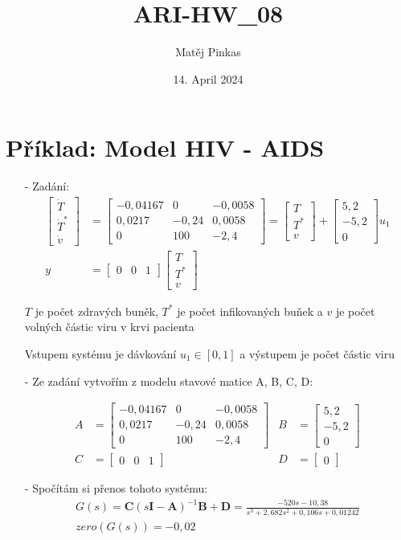 \documentclass{article}
\title{ARI-HW\_08}
\author{Matěj Pinkas}
\date{14. April 2024}
\newcommand\mat[1]{\begin{bmatrix}#1\end{bmatrix}}
\begin{document}
\maketitlessz

\section{Příklad: Model HIV - AIDS}
\begin{itemize}
    \item[-] Zadání: 
    \begin{align*}
        \mat{\dot{T}\\\dot{T}^*\\\dot{v}} &= \mat{-0,04167 & 0 & -0,0058\\0,0217 & -0,24 & 0,0058\\0 & 100 & -2,4} = \mat{T\\T^*\\v} + \mat{5,2\\-5,2\\0}u_1\\
        y &= \mat{0 & 0 & 1} \mat{T\\T^*\\v}
    \end{align*}
    \item[] $T$ je počet zdravých buněk, $T^*$ je počet infikovaných buňek a $v$ je počet volných částic viru v krvi pacienta
    \item[] Vstupem systému je dávkování $u_1 \in [0,1]$ a výstupem je počet částic viru
    
    \item[-] Ze zadání vytvořím z modelu stavové matice A, B, C, D:

    \begin{align*}
        A &= \mat{-0,04167 & 0 & -0,0058\\
                 0,0217 & -0,24 & 0,0058\\
                 0 & 100 & -2,4} 
        & 
        B &= \mat{5,2\\ -5,2\\ 0}\\
        C &= \mat{0 & 0 & 1}
        &
        D &= \mat{0}
    \end{align*}

    \item[-] Spočítám si přenos tohoto systému:
    \begin{align*}
        G(s) = \mathbf{C}(s\mathbf{I}-\mathbf{A})^{-1}\mathbf{B}+\mathbf{D} = \frac{-520s-10,38}{s^3+2,682s^2+0,106s+0,01242}\\
        zero(G(s)) = -0,02
    \end{align*}


\end{itemize}
\end{document}
